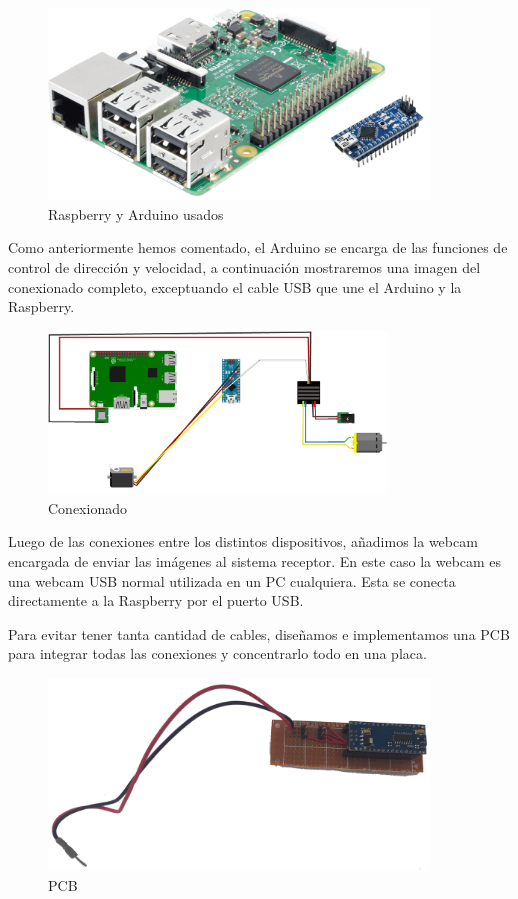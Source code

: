 \documentclass{pclass}
\begin{document}
\begin{itemize}
\begin{figure}[H]
	\centering
	\includegraphics[width=0.9\textwidth]{img/raspArd}
	\caption{Raspberry y Arduino usados}
	\label{fig:RaspArd}
\end{figure}

Como anteriormente hemos comentado, el Arduino se encarga de las funciones de control de dirección y velocidad, a continuación mostraremos una imagen del conexionado completo, exceptuando el cable USB que une el Arduino y la Raspberry.

\begin{figure}[H]
	\centering
	\includegraphics[angle=90,width=0.8\textwidth]{img/conexionado}
	\caption{Conexionado}
	\label{fig:conexionado}
\end{figure}

Luego de las conexiones entre los distintos dispositivos, añadimos la webcam encargada de enviar las imágenes al sistema receptor. En este caso la webcam es una webcam USB normal utilizada en un PC cualquiera. Esta se conecta directamente a la Raspberry por el puerto USB. 

Para evitar tener tanta cantidad de cables, diseñamos e implementamos una PCB para integrar todas las conexiones y concentrarlo todo en una placa.

\begin{figure}[H]
	\centering
	\includegraphics[width=0.9\textwidth]{img/pcb}
	\caption{PCB}
	\label{fig:pcb}
\end{figure}


\end{itemize}
\end{document}
